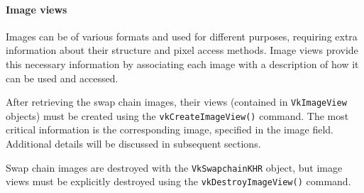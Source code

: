 \paragraph*{Image views}
Images can be of various formats and used for different purposes, requiring extra information about their structure and pixel access methods. 
Image views provide this necessary information by associating each image with a description of how it can be used and accessed.

After retrieving the swap chain images, their views (contained in \texttt{VkImageView} objects) must be created using the \texttt{vkCreateImageView()} command. 
The most critical information is the corresponding image, specified in the image field. Additional details will be discussed in subsequent sections.

Swap chain images are destroyed with the \texttt{VkSwapchainKHR} object, but image views must be explicitly destroyed using the \texttt{vkDestroyImageView()} command.